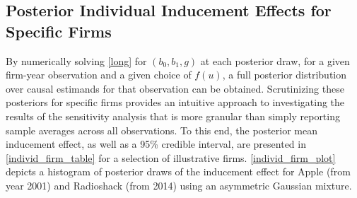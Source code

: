 \documentclass[aoas,preprint, 11pt, dvipsnames, table, x11name]{imsart}
\theoremstyle{remark}
\begin{document}
	\subsection{Posterior Individual Inducement Effects for Specific Firms}\label{individ_firms}
	By numerically solving \autoref{long} for $(b_0, b_1, g)$ at each posterior draw, for a given firm-year observation and a given choice of $f(u)$, a full posterior distribution over causal estimands for that observation can be obtained.  Scrutinizing these posteriors for specific firms provides an intuitive approach to investigating the results of the sensitivity analysis that is more granular than simply reporting sample averages across all observations. To this end, the posterior mean inducement effect, as well as a 95\% credible interval, are presented in \autoref{individ_firm_table} for a selection of illustrative firms.  \autoref{individ_firm_plot} depicts a histogram of posterior draws of the inducement effect for Apple (from year 2001) and Radioshack (from 2014) using an asymmetric Gaussian mixture.
\end{document}
